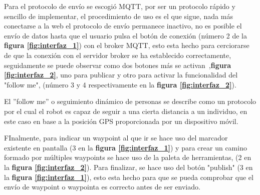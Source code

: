 Para el protocolo de envío se escogió MQTT, por ser un protocolo rápido y sencillo de implementar, el procedimiento de uso es el que 
sigue, nada más conectarse a la web el protocolo de envío permanece inactivo, no es posible el envío de datos hasta que el usuario pulsa el 
botón de conexión (número 2 de la \textbf{figura \ref{fig:interfaz_1}}) con el broker MQTT, esto esta hecho para cerciorarse de que 
la conexión con el servidor broker se ha establecido correctamente, seguidamente se puede observar como dos botones más se activan~,\textbf{figura \ref{fig:interfaz_2}}, 
uno para publicar y otro para activar la funcionalidad del "follow me", (número 3 y 4 respectivamente en la 
\textbf{ figura \ref{fig:interfaz_2}}).

El ''follow me'' o seguimiento dinámico de personas se describe como un protocolo por el cual el robot es capaz de seguir a una cierta distancia a un individuo, en este caso en base 
a la posición GPS proporcionada por un dispositivo móvil.

FInalmente, para indicar un waypoint al que ir se hace uso del marcador existente en pantalla 
(3 en la \textbf{figura \ref{fig:interfaz_1}}) y para crear un camino formado por múltiples waypoints se hace uso de la paleta de 
herramientas, (2 en la \textbf{figura \ref{fig:interfaz_2}}). Para finalizar, se hace uso del botón "publish" 
(3 en la \textbf{figura \ref{fig:interfaz_1}}), esto esta hecho para que se pueda comprobar que el envío de waypoint o waypointa es correcto antes 
de ser enviado.

